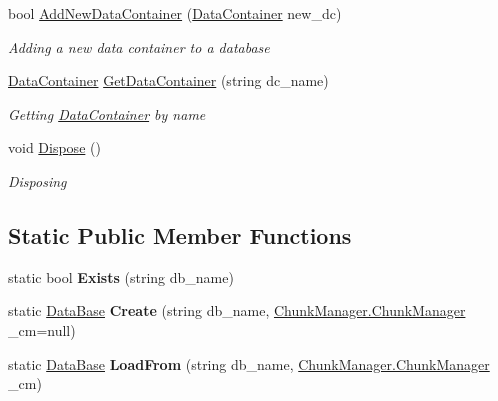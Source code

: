 \begin{DoxyCompactItemize}
\item 
bool \hyperlink{class_dwarf_d_b_1_1_data_structures_1_1_data_base_a251d5fa0ba9b21d911a9a1c5dcf33152}{Add\+New\+Data\+Container} (\hyperlink{class_dwarf_d_b_1_1_data_structures_1_1_data_container}{Data\+Container} new\+\_\+dc)
\begin{DoxyCompactList}\small\item\em Adding a new data container to a database \end{DoxyCompactList}\item 
\hyperlink{class_dwarf_d_b_1_1_data_structures_1_1_data_container}{Data\+Container} \hyperlink{class_dwarf_d_b_1_1_data_structures_1_1_data_base_aa554e79937460eb937b90d81093019b5}{Get\+Data\+Container} (string dc\+\_\+name)
\begin{DoxyCompactList}\small\item\em Getting \hyperlink{class_dwarf_d_b_1_1_data_structures_1_1_data_container}{Data\+Container} by name \end{DoxyCompactList}\item 
void \hyperlink{class_dwarf_d_b_1_1_data_structures_1_1_data_base_a35fdd80e2d23da47200c8de150a88642}{Dispose} ()
\begin{DoxyCompactList}\small\item\em Disposing \end{DoxyCompactList}\end{DoxyCompactItemize}
\subsection*{Static Public Member Functions}
\begin{DoxyCompactItemize}
\item 
\hypertarget{class_dwarf_d_b_1_1_data_structures_1_1_data_base_a984abdba15e81a2f8e5cd1345986202a}{static bool {\bfseries Exists} (string db\+\_\+name)}\label{class_dwarf_d_b_1_1_data_structures_1_1_data_base_a984abdba15e81a2f8e5cd1345986202a}

\item 
\hypertarget{class_dwarf_d_b_1_1_data_structures_1_1_data_base_a2125965bbb7654634bced7627cc5ad88}{static \hyperlink{class_dwarf_d_b_1_1_data_structures_1_1_data_base}{Data\+Base} {\bfseries Create} (string db\+\_\+name, \hyperlink{class_dwarf_d_b_1_1_chunk_manager_1_1_chunk_manager}{Chunk\+Manager.\+Chunk\+Manager} \+\_\+cm=null)}\label{class_dwarf_d_b_1_1_data_structures_1_1_data_base_a2125965bbb7654634bced7627cc5ad88}

\item 
\hypertarget{class_dwarf_d_b_1_1_data_structures_1_1_data_base_af709d60f64dc5065a95dc678ebc03f30}{static \hyperlink{class_dwarf_d_b_1_1_data_structures_1_1_data_base}{Data\+Base} {\bfseries Load\+From} (string db\+\_\+name, \hyperlink{class_dwarf_d_b_1_1_chunk_manager_1_1_chunk_manager}{Chunk\+Manager.\+Chunk\+Manager} \+\_\+cm)}\label{class_dwarf_d_b_1_1_data_structures_1_1_data_base_af709d60f64dc5065a95dc678ebc03f30}

\end{DoxyCompactItemize}
